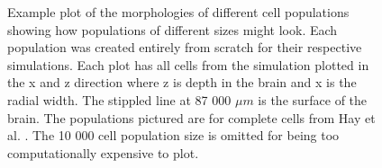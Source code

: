 \documentclass[final, a4paper,masters,en,listoffigures,listoftables,norwegiandates]{NMBU}
\begin{document}
\begin{figure}[htbp]
    \centering
    \caption{Example plot of the morphologies of different cell populations showing how populations of different sizes might look. Each population was created entirely from scratch for their respective simulations. Each plot has all cells from the simulation plotted in the x and z direction where z is depth in the brain and x is the radial width. The stippled line at 87 000 $\mu m$ is the surface of the brain. The populations pictured are for complete cells from Hay et al. \cite{Hay2011}. The 10 000 cell population size is omitted for being too computationally expensive to plot.}
    \label{fig:popmorphs}
\end{figure}
\end{document}
